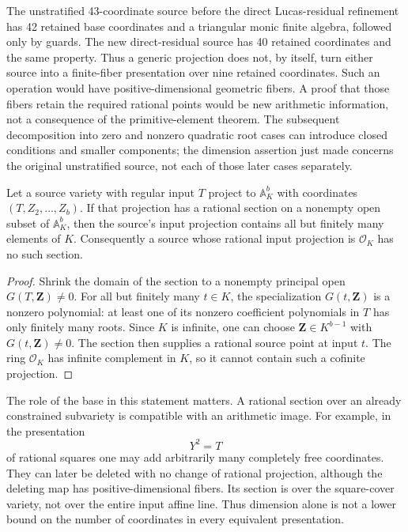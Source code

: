 The unstratified 43-coordinate source before the direct Lucas-residual
refinement has 42 retained base coordinates and a triangular monic
finite algebra, followed only by guards.  The new direct-residual
source has 40 retained coordinates and the same property.  Thus a
generic projection does not, by itself, turn either source into a
finite-fiber presentation over nine retained coordinates.  Such an
operation would have positive-dimensional geometric fibers.  A proof
that those fibers retain the required rational points would be new
arithmetic information, not a consequence of the primitive-element
theorem.  The subsequent decomposition into zero and nonzero quadratic
root cases can introduce closed conditions and smaller components;
the dimension assertion just made concerns the original unstratified
source, not each of those later cases separately.

\begin{proposition}\label{p3sys:no-generic-rational-section}
Let a source variety with regular input $T$ project to
$\mathbb A^b_K$ with coordinates $(T,Z_2,\ldots,Z_b)$.
If that projection has a rational section on a nonempty open
subset of $\mathbb A^b_K$, then the source's input projection
contains all but finitely many elements of $K$.
Consequently a source whose rational input projection is
$\mathcal O_K$ has no such section.
\end{proposition}
\begin{proof}
Shrink the domain of the section to a nonempty principal open
$G(T,\mathbf Z)\ne0$.  For all but finitely many $t\in K$,
the specialization $G(t,\mathbf Z)$ is a nonzero polynomial:
at least one of its nonzero coefficient polynomials in $T$
has only finitely many roots.  Since $K$ is infinite, one can
choose $\mathbf Z\in K^{b-1}$ with $G(t,\mathbf Z)\ne0$.
The section then supplies a rational source point at input $t$.
The ring $\mathcal O_K$ has infinite complement in $K$, so it
cannot contain such a cofinite projection.
\end{proof}

The role of the base in this statement matters.  A rational section
over an already constrained subvariety is compatible with an
arithmetic image.  For example, in the presentation
\[
                         Y^2=T
\]
of rational squares one may add arbitrarily many completely free
coordinates.  They can later be deleted with no change of rational
projection, although the deleting map has positive-dimensional fibers.
Its section is over the square-cover variety, not over the entire
input affine line.  Thus dimension alone is not a lower bound on the
number of coordinates in every equivalent presentation.

